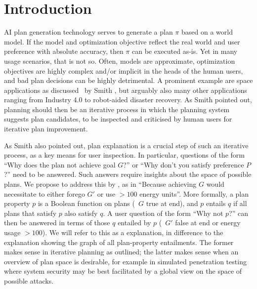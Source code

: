 \section{Introduction}
\label{introduction}

AI plan generation technology serves to generate a plan $\pi$ based on
a world model. If the model and optimization objective reflect the
real world and user preference with absolute accuracy, then $\pi$ can
be executed as-is. Yet in many usage scenarios, that is not so. Often,
models are approximate, optimization objectives are highly complex
and/or implicit in the heads of the human users, and bad plan
decisions can be highly detrimental. A prominent example are space
applications as discussed \eg\ by Smith , but
arguably also many other applications ranging from Industry 4.0 to
robot-aided disaster recovery. As Smith pointed out, planning should
then be an iterative process in which the planning system suggests
plan candidates, to be inspected and criticised by human users for
iterative plan improvement.

As Smith also pointed out, plan explanation is a crucial step of such
an iterative process, as a key means for user inspection. In
particular, questions of the form ``Why does the plan not achieve goal
$G$?'' or ``Why don't you satisfy preference $P$?'' need to be
answered. Such answers require insights about the space of possible
plans. We propose to address this by , as in ``Because achieving $G$ would necessitate to
either forego $G'$ or use $> 100$ energy units''. More formally, a
plan property $p$ is a Boolean function on plans (\eg\ $G$ true at
end), and $p$ entails $q$ if all plans that satisfy $p$ also satisfy
$q$.  A user question of the form ``Why not $p$?'' can then be
answered in terms of those $q$ entailed by $p$ (\eg\ $G'$ false at end
or energy usage $> 100$). We will refer to this as a 
explanation, in difference to the  explanation showing
the graph of all plan-property entailments. The former makes sense in
iterative planning as outlined; the latter makes sense when an
overview of plan space is desirable, for example in simulated
penetration testing \cite{boddy:etal:icaps-05,hoffmann:icaps-15} where
system security may be best facilitated by a global view on the space
of possible attacks.
%
  

